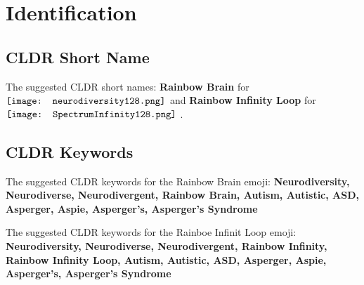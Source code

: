 \section{Identification}

\subsection{CLDR Short Name}
The suggested CLDR short names: \textbf{Rainbow Brain} for 
$\vcenter{\hbox{\texttt{[image: neurodiversity128.png]}}}$
and \textbf{Rainbow Infinity Loop} for
$\vcenter{\hbox{\texttt{[image: SpectrumInfinity128.png]}}}$
.


\subsection{CLDR Keywords}
The suggested CLDR keywords for the Rainbow Brain emoji: \textbf{Neurodiversity,
Neurodiverse,
Neurodivergent,
Rainbow Brain,
Autism,
Autistic,
ASD,
Asperger,
Aspie,
Asperger's,
Asperger's Syndrome}

The suggested CLDR keywords for the Rainboe Infinit Loop emoji: \textbf{Neurodiversity,
Neurodiverse,
Neurodivergent,
Rainbow Infinity,
Rainbow Infinity Loop,
Autism,
Autistic,
ASD,
Asperger,
Aspie,
Asperger's,
Asperger's Syndrome}
